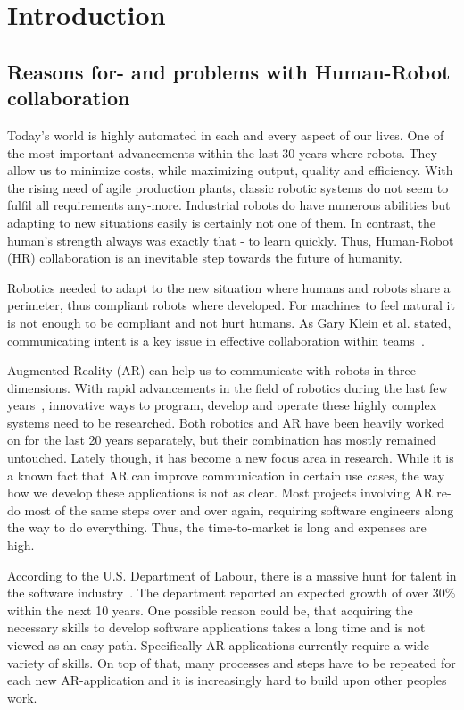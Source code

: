 \chapter{Introduction}\label{Chap:Introduction}

\section{Reasons for- and problems with Human-Robot collaboration}
Today's world is highly automated in each and every aspect of our lives. One of the most important advancements within the last 30 years where robots. They allow us to minimize costs, while maximizing output, quality and efficiency. With the rising need of agile production plants, classic robotic systems do not seem to fulfil all requirements any-more. Industrial robots do have numerous abilities but adapting to new situations easily is certainly not one of them. In contrast, the human's strength always was exactly that - to learn quickly. Thus, Human-Robot (HR) collaboration is an inevitable step towards the future of humanity.

Robotics needed to adapt to the new situation where humans and robots share a perimeter, thus compliant robots where developed. For machines to feel natural it is not enough to be compliant and not hurt humans. As Gary Klein et al. stated, communicating intent is a key issue in effective collaboration within teams~\cite{klein2005common}. 

Augmented Reality (AR) can help us to communicate with robots in three dimensions. With rapid advancements in the field of robotics during the last few years~\cite{laschi2016soft}, innovative ways to program, develop and operate these highly complex systems need to be researched. Both robotics and AR have been heavily worked on for the last 20 years separately, but their combination has mostly remained untouched. Lately though, it has become a new focus area in research. While it is a known fact that AR can improve communication in certain use cases, the way how we develop these applications is not as clear. Most projects involving AR re-do most of the same steps over and over again, requiring software engineers along the way to do everything. Thus, the time-to-market is long and expenses are high.

According to the U.S. Department of Labour, there is a massive hunt for talent in the software industry~\cite{blsGov}. The department reported an expected growth of over 30\% within the next 10 years. One possible reason could be, that acquiring the necessary skills to develop software applications takes a long time and is not viewed as an easy path. Specifically AR applications currently require a wide variety of skills. On top of that, many processes and steps have to be repeated for each new AR-application and it is increasingly hard to build upon other peoples work.

